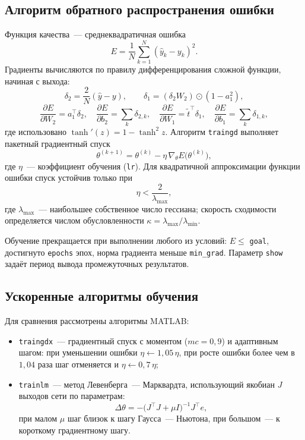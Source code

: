\documentclass[14pt,a4paper]{extarticle}
\begin{document}
\subsection{Алгоритм обратного распространения ошибки}

Функция качества~--- среднеквадратичная ошибка
\begin{equation}
E = \frac{1}{N}\sum_{k=1}^{N} (\hat y_k - y_k)^2 .
\end{equation}
Градиенты вычисляются по правилу дифференцирования сложной функции, начиная с выхода:
\begin{equation}
\delta_2 = \frac{2}{N}(\hat y - y), \qquad \delta_1 = (\delta_2 W_2) \odot (1 - a_1^2),
\end{equation}
\begin{equation}
\frac{\partial E}{\partial W_2} = a_1^\top \delta_2, \quad \frac{\partial E}{\partial b_2} = \sum_k \delta_{2,k}, \quad
\frac{\partial E}{\partial W_1} = \tilde t^\top \delta_1, \quad \frac{\partial E}{\partial b_1} = \sum_k \delta_{1,k},
\end{equation}
где использовано $\tanh'(z) = 1 - \tanh^2 z$. Алгоритм \texttt{traingd} выполняет пакетный градиентный спуск
\begin{equation}
\theta^{(k+1)} = \theta^{(k)} - \eta\, \nabla_\theta E\bigl(\theta^{(k)}\bigr),
\end{equation}
где $\eta$~--- коэффициент обучения (\texttt{lr}). Для квадратичной аппроксимации функции ошибки спуск устойчив только при
\begin{equation}
\eta < \frac{2}{\lambda_{\max}},
\end{equation}
где $\lambda_{\max}$~--- наибольшее собственное число гессиана; скорость сходимости определяется числом обусловленности $\kappa = \lambda_{\max} / \lambda_{\min}$.

Обучение прекращается при выполнении любого из условий: $E \le$ \texttt{goal}, достигнуто \texttt{epochs} эпох, норма градиента меньше \texttt{min\_grad}. Параметр \texttt{show} задаёт период вывода промежуточных результатов.

\subsection{Ускоренные алгоритмы обучения}

Для сравнения рассмотрены алгоритмы MATLAB:
\begin{itemize}
\item \texttt{traingdx}~--- градиентный спуск с моментом ($mc = 0{,}9$) и адаптивным шагом: при уменьшении ошибки $\eta \leftarrow 1{,}05\,\eta$, при росте ошибки более чем в $1{,}04$ раза шаг отменяется и $\eta \leftarrow 0{,}7\,\eta$;
\item \texttt{trainlm}~--- метод Левенберга~--- Марквардта, использующий якобиан $J$ выходов сети по параметрам:
\begin{equation}
\Delta\theta = -\bigl(J^\top J + \mu I\bigr)^{-1} J^\top e,
\end{equation}
при малом $\mu$ шаг близок к шагу Гаусса~--- Ньютона, при большом~--- к короткому градиентному шагу.
\end{itemize}
\end{document}

